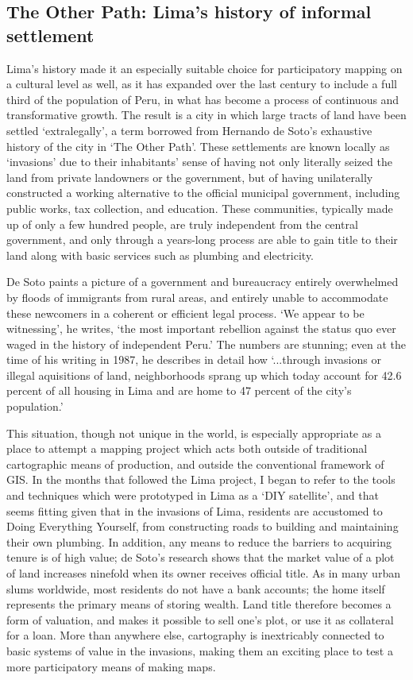 \documentclass[11pt,oneside,notitlepage]{report}
\begin{document}
{{\subsection{The Other Path: Lima's history of informal settlement}

Lima's history made it an especially suitable choice for participatory mapping on a cultural level as well, as it has expanded over the last century to include a full third of the population of Peru, in what has become a process of continuous and transformative growth. The result is a city in which large tracts of land have been settled `extralegally', a term borrowed from Hernando de Soto's exhaustive history of the city in `The Other Path'. These settlements are known locally as `invasions' due to their inhabitants' sense of having not only literally seized the land from private landowners or the government, but of having unilaterally constructed a working alternative to the official municipal government, including public works, tax collection, and education. These communities, typically made up of only a few hundred people, are truly independent from the central government, and only through a years-long process are able to gain title to their land along with basic services such as plumbing and electricity.

De Soto paints a picture of a government and bureaucracy entirely overwhelmed by floods of immigrants from rural areas, and entirely unable to accommodate these newcomers in a coherent or efficient legal process. `We appear to be witnessing', he writes, `the most important rebellion against the status quo ever waged in the history of independent Peru.' The numbers are stunning; even at the time of his writing in 1987, he describes in detail how `...through invasions or illegal aquisitions of land, neighborhoods sprang up which today account for 42.6 percent of all housing in Lima and are home to 47 percent of the city's population.' \cite{desoto1987sendero}

This situation, though not unique in the world, is especially appropriate as a place to attempt a mapping project which acts both outside of traditional cartographic means of production, and outside the conventional framework of GIS. In the months that followed the Lima project, I began to refer to the tools and techniques which were prototyped in Lima as a `DIY satellite', and that seems fitting given that in the invasions of Lima, residents are accustomed to Doing Everything Yourself, from constructing roads to building and maintaining their own plumbing. In addition, any means to reduce the barriers to acquiring tenure is of high value; de Soto's research shows that the market value of a plot of land increases ninefold when its owner receives official title. As in many urban slums worldwide, most residents do not have a bank accounts; the home itself represents the primary means of storing wealth. Land title therefore becomes a form of valuation, and makes it possible to sell one's plot, or use it as collateral for a loan. More than anywhere else, cartography is inextricably connected to basic systems of value in the invasions, making them an exciting place to test a more participatory means of making maps. 

}}
\end{document}
